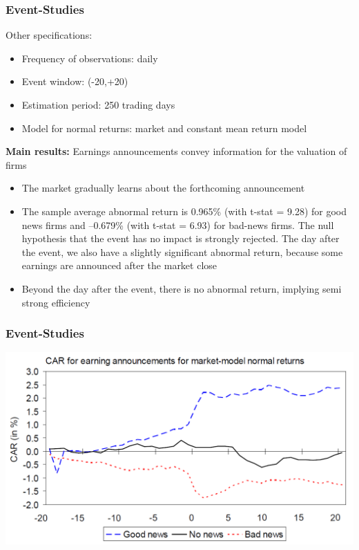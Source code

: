 \documentclass[xcolor=dvipsnames, english, 8pt]{beamer}
\begin{document}
\begin{frame}
    \frametitle{Event-Studies}


Other specifications:\vspace{0.25cm}\\
\begin{itemize}
    \item Frequency of observations: daily
    \item Event window: (-20,+20)
    \item Estimation period: 250 trading days
    \item Model for normal returns: market and constant mean return model\vspace{0.25cm}\\
\end{itemize}
\textbf{{\color{ubRed}Main results}:} Earnings announcements convey information for the valuation of firms
\begin{itemize}
    \item The market gradually learns about the forthcoming announcement
    \item The sample average abnormal return is 0.965\% (with t-stat = 9.28) for good news
firms and –0.679\% (with t-stat = 6.93) for bad-news firms. The null
hypothesis that the event has no impact is strongly rejected. The day after the
event, we also have a slightly significant abnormal return, because some
earnings are announced after the market close
    \item Beyond the day after the event, there is no abnormal return, implying semi strong
efficiency
\end{itemize}
\end{frame}

\begin{frame}
    \frametitle{Event-Studies}
    \begin{center}
        \includegraphics[scale=0.35]{ES1}
    \end{center}
\end{frame}
\end{document}
